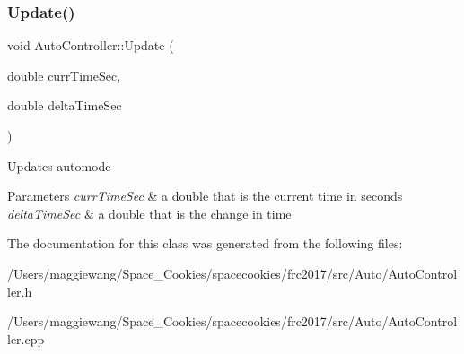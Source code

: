 \subsubsection{\texorpdfstring{Update()}{Update()}}
{\footnotesize\ttfamily void Auto\+Controller\+::\+Update (\begin{DoxyParamCaption}\item[{double}]{curr\+Time\+Sec,  }\item[{double}]{delta\+Time\+Sec }\end{DoxyParamCaption})}

Updates automode 
\begin{DoxyParams}{Parameters}
{\em curr\+Time\+Sec} & a double that is the current time in seconds \\
\hline
{\em delta\+Time\+Sec} & a double that is the change in time \\
\hline
\end{DoxyParams}


The documentation for this class was generated from the following files\+:\begin{DoxyCompactItemize}
\item 
/\+Users/maggiewang/\+Space\+\_\+\+Cookies/spacecookies/frc2017/src/\+Auto/Auto\+Controller.\+h\item 
/\+Users/maggiewang/\+Space\+\_\+\+Cookies/spacecookies/frc2017/src/\+Auto/Auto\+Controller.\+cpp\end{DoxyCompactItemize}
